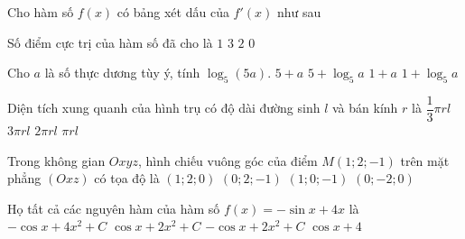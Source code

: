 \begin{ex}%
Cho hàm số $f(x)$ có bảng xét dấu của $f'(x)$  như sau
\begin{center}
\end{center}	
Số điểm cực trị của hàm số đã cho là
	\choice
	{$1$}
	{\True $3$}
	{$2$}
	{$0$}
\end{ex}

\begin{ex}%
Cho $a$ là số thực dương tùy ý, tính	$\log_5(5a)$.
	\choice
	{$5+a$}
	{$5+\log_5a$}
	{$1+a$}
	{\True $1+\log_5a$}
\end{ex}

\begin{ex}%
	Diện tích xung quanh của hình trụ có độ dài đường sinh $l$ và bán kính $r$ là
	\choice
	{$\dfrac{1}{3}\pi rl$}
	{$3\pi rl$}
	{\True $2\pi rl$}
	{$\pi rl$}
\end{ex}

\begin{ex}%
	Trong không gian $Oxyz$, hình chiếu vuông góc của điểm $M(1;2;-1)$ trên mặt phẳng $(Oxz)$ có tọa	độ là
	\choice
	{$(1;2;0)$}
	{$(0;2;-1)$}
	{\True $(1;0;-1)$}
	{$(0;-2;0)$}
\end{ex}

\begin{ex}%
	Họ tất cả các nguyên hàm của hàm số $f(x)=-\sin x+4x$ là
	\choice
	{$-\cos x+4x^2+C$}
	{\True $\cos x+2x^2+C$}
	{$-\cos x+2x^2+C$}
	{$\cos x+4$}
\end{ex}

